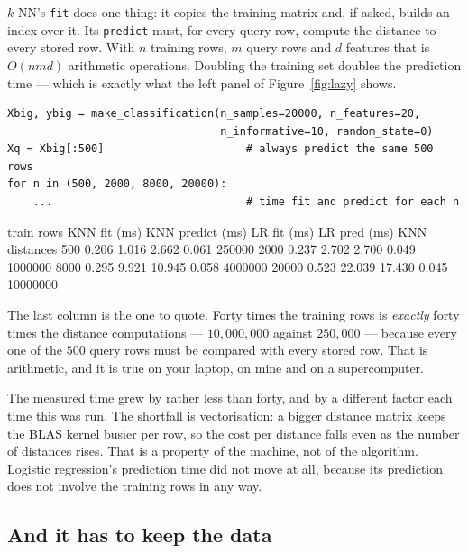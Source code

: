 \documentclass[11pt]{article}
\begin{document}
\begin{worked}
$k$-NN's \texttt{fit} does one thing: it copies the training matrix and, if
asked, builds an index over it. Its \texttt{predict} must, for every query
row, compute the distance to every stored row. With $n$ training rows, $m$
query rows and $d$ features that is $O(nmd)$ arithmetic operations. Doubling
the training set doubles the prediction time --- which is exactly what the left
panel of Figure~\ref{fig:lazy} shows.
\end{worked}

\begin{lstlisting}
Xbig, ybig = make_classification(n_samples=20000, n_features=20,
                                 n_informative=10, random_state=0)
Xq = Xbig[:500]                      # always predict the same 500 rows
for n in (500, 2000, 8000, 20000):
    ...                              # time fit and predict for each n
\end{lstlisting}
\begin{codeout}
train rows   KNN fit (ms)   KNN predict (ms)   LR fit (ms)   LR pred (ms)   KNN distances
       500          0.206              1.016         2.662         0.061          250000
      2000          0.237              2.702         2.700         0.049         1000000
      8000          0.295              9.921        10.945         0.058         4000000
     20000          0.523             22.039        17.430         0.045       10000000
\end{codeout}

The last column is the one to quote. Forty times the training rows is
\emph{exactly} forty times the distance computations --- $10{,}000{,}000$
against $250{,}000$ --- because every one of the $500$ query rows must be
compared with every stored row. That is arithmetic, and it is true on your
laptop, on mine and on a supercomputer.

The measured time grew by rather less than forty, and by a different factor
each time this was run. The shortfall is vectorisation: a bigger distance
matrix keeps the BLAS kernel busier per row, so the cost per distance falls
even as the number of distances rises. That is a property of the machine, not
of the algorithm. Logistic regression's prediction time did not move at all,
because its prediction does not involve the training rows in any way.

\subsection{And it has to keep the data}
\end{document}
